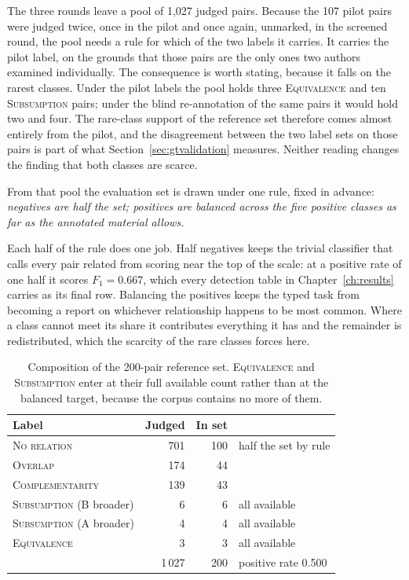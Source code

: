 The three rounds leave a pool of 1{,}027 judged pairs. Because the 107 pilot
pairs were judged twice, once in the pilot and once again, unmarked, in the
screened round, the pool needs a rule for which of the two labels it carries. It
carries the pilot label, on the grounds that those pairs are the only ones two
authors examined individually. The consequence is worth stating, because it falls
on the rarest classes. Under the pilot labels the pool holds three
\textsc{Equivalence} and ten \textsc{Subsumption} pairs; under the blind
re-annotation of the same pairs it would hold two and four. The rare-class
support of the reference set therefore comes almost entirely from the pilot, and
the disagreement between the two label sets on those pairs is part of what
Section~\ref{sec:gtvalidation} measures. Neither reading changes the finding
that both classes are scarce.

From that pool the
evaluation set is drawn under one rule, fixed in advance: \emph{negatives are
half the set; positives are balanced across the five positive classes as far as
the annotated material allows.}

Each half of the rule does one job. Half negatives keeps the trivial classifier
that calls every pair related from scoring near the top of the scale: at a
positive rate of one half it scores $F_1 = 0.667$, which every detection table
in Chapter~\ref{ch:results} carries as its final row. Balancing the positives
keeps the typed task from becoming a report on whichever relationship happens to
be most common. Where a class cannot meet its share it contributes everything it
has and the remainder is redistributed, which the scarcity of the rare classes
forces here.

\begin{table}[htbp]
\centering
\caption{Composition of the 200-pair reference set. \textsc{Equivalence} and
\textsc{Subsumption} enter at their full available count rather than at the
balanced target, because the corpus contains no more of them.}
\label{tab:sampling}
\small
\begin{tabular}{lrrl}
\toprule
Label & Judged & In set & \\
\midrule
\textsc{No relation}           & 701 & 100 & half the set by rule\\
\textsc{Overlap}               & 174 &  44 & \\
\textsc{Complementarity}       & 139 &  43 & \\
\textsc{Subsumption} (B broader) &   6 &   6 & all available\\
\textsc{Subsumption} (A broader) &   4 &   4 & all available\\
\textsc{Equivalence}           &   3 &   3 & all available\\
\midrule
                               & 1\,027 & 200 & positive rate 0.500\\
\bottomrule
\end{tabular}
\end{table}

